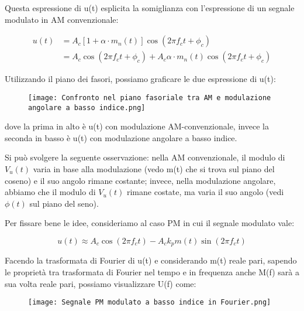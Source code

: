 Questa espressione di u(t) esplicita la somiglianza con l'espressione di un segnale modulato in AM convenzionale: 

{
    \Large 
    \begin{equation} 
        \begin{split}
        u (t)
        &= 
        A_c 
        [1 + \alpha \cdot m_n (t)] 
        \cos(2 \pi f_c t + \phi_c)
        \\
        &= 
        A_c \cos(2 \pi f_c t + \phi_c)
        +
        A_c \alpha \cdot m_n (t) \cos(2 \pi f_c t + \phi_c)
        \end{split}
    \end{equation}
}

\newpage 

Utilizzando il piano dei fasori, 
possiamo graficare le due espressione di u(t): 

\begin{figure}[h]
    \centering
    \texttt{[image: Confronto nel piano fasoriale tra AM e modulazione angolare a basso indice.png]}
\end{figure} 

dove la prima in alto è u(t) con modulazione AM-convenzionale, 
invece la seconda in basso è u(t) con modulazione angolare a basso indice. \newline 

Si può svolgere la seguente osservazione: 
nella AM convenzionale, il modulo di $V_u (t)$ varia in base alla modulazione (vedo m(t) che si trova sul piano del coseno) e il suo angolo rimane costante; 
invece, nella modulazione angolare, abbiamo che il modulo di $V_u (t)$ rimane costate, ma varia il suo angolo (vedi $\phi (t)$ sul piano del seno). \newline 

Per fissare bene le idee, consideriamo al caso PM in cui il segnale modulato vale: 

{
    \Large 
    \begin{equation}
        u(t) 
        \approx
        A_c \cos(2 \pi f_c t)
        - 
        A_c k_p m(t) \sin(2 \pi f_c t) 
    \end{equation}
}

Facendo la trasformata di Fourier di u(t) e considerando m(t) reale pari, sapendo le proprietà tra trasformata di Fourier nel tempo e in frequenza anche M(f) sarà a sua volta reale pari, 
possiamo visualizzare U(f) come: 

\begin{figure}[h]
    \centering
    \texttt{[image: Segnale PM modulato a basso indice in Fourier.png]}
\end{figure} 

